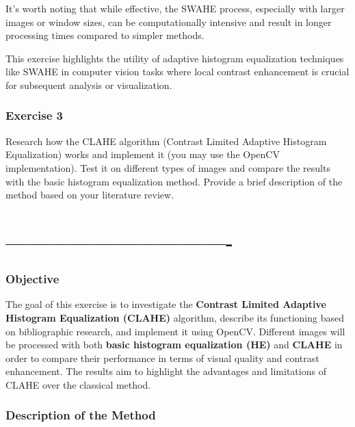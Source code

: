 \documentclass[11pt]{article}
\begin{document}
It's worth noting that while effective, the SWAHE process, especially with larger images or window sizes, can be computationally intensive and result in longer processing times compared to simpler methods.

This exercise highlights the utility of adaptive histogram equalization techniques like SWAHE in computer vision tasks where local contrast enhancement is crucial for subsequent analysis or visualization.
    { \hspace*{\fill} \\}
    
    \hypertarget{exercise-3}{%
\subsubsection{Exercise 3}\label{exercise-3}}

Research how the CLAHE algorithm (Contrast Limited Adaptive Histogram
Equalization) works and implement it (you may use the OpenCV
implementation). Test it on different types of images and compare the
results with the basic histogram equalization method. Provide a brief
description of the method based on your literature review.

\hypertarget{section}{%
\section{-------------------------------}\label{section}}

    \hypertarget{objective}{%
\subsubsection{Objective}\label{objective}}

The goal of this exercise is to investigate the \textbf{Contrast Limited
Adaptive Histogram Equalization (CLAHE)} algorithm, describe its
functioning based on bibliographic research, and implement it using
OpenCV. Different images will be processed with both \textbf{basic
histogram equalization (HE)} and \textbf{CLAHE} in order to compare
their performance in terms of visual quality and contrast enhancement.
The results aim to highlight the advantages and limitations of CLAHE
over the classical method.

    \hypertarget{description-of-the-method}{%
\subsubsection{Description of the
Method}\label{description-of-the-method}}
\end{document}
